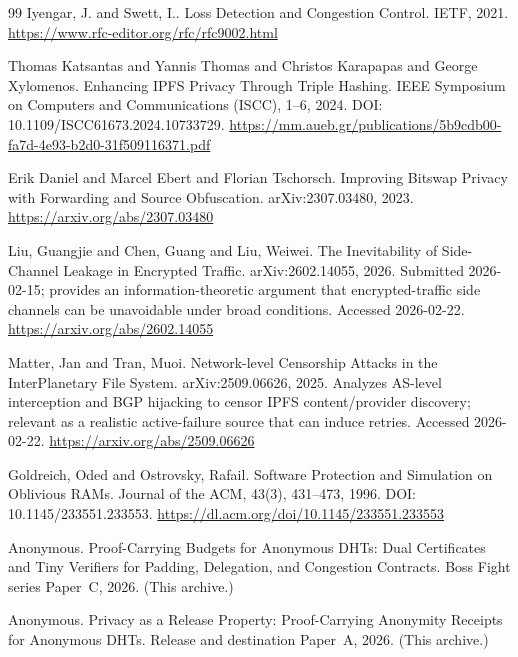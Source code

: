 \documentclass[11pt]{article}
\begin{document}
\begin{thebibliography}{99}
Iyengar, J. and Swett, I..
 Loss Detection and Congestion Control.
\newblock IETF, 2021.
\newblock \url{https://www.rfc-editor.org/rfc/rfc9002.html}

Thomas Katsantas and Yannis Thomas and Christos Karapapas and George Xylomenos.
\newblock Enhancing {IPFS} Privacy Through Triple Hashing.
 {IEEE} Symposium on Computers and Communications (ISCC), 1--6, 2024.
\newblock DOI: 10.1109/ISCC61673.2024.10733729.
\newblock \url{https://mm.aueb.gr/publications/5b9cdb00-fa7d-4e93-b2d0-31f509116371.pdf}

Erik Daniel and Marcel Ebert and Florian Tschorsch.
\newblock Improving {Bitswap} Privacy with Forwarding and Source Obfuscation.
\newblock arXiv:2307.03480, 2023.
\newblock \url{https://arxiv.org/abs/2307.03480}

Liu, Guangjie and Chen, Guang and Liu, Weiwei.
\newblock The Inevitability of Side-Channel Leakage in Encrypted Traffic.
\newblock arXiv:2602.14055, 2026.
\newblock Submitted 2026-02-15; provides an information-theoretic argument that encrypted-traffic side channels can be unavoidable under broad conditions. Accessed 2026-02-22.
\newblock \url{https://arxiv.org/abs/2602.14055}

Matter, Jan and Tran, Muoi.
\newblock Network-level Censorship Attacks in the InterPlanetary File System.
\newblock arXiv:2509.06626, 2025.
\newblock Analyzes AS-level interception and BGP hijacking to censor IPFS content/provider discovery; relevant as a realistic active-failure source that can induce retries. Accessed 2026-02-22.
\newblock \url{https://arxiv.org/abs/2509.06626}

Goldreich, Oded and Ostrovsky, Rafail.
\newblock Software Protection and Simulation on Oblivious {RAM}s.
\newblock Journal of the {ACM}, 43(3), 431--473, 1996.
\newblock DOI: 10.1145/233551.233553.
\newblock \url{https://dl.acm.org/doi/10.1145/233551.233553}

Anonymous.
\newblock Proof-Carrying Budgets for Anonymous DHTs: Dual Certificates and Tiny Verifiers for Padding, Delegation, and Congestion Contracts.
\newblock Boss Fight series Paper~C, 2026. (This archive.)

Anonymous.
\newblock Privacy as a Release Property: Proof-Carrying Anonymity Receipts for Anonymous DHTs.
\newblock Release and destination Paper~A, 2026. (This archive.)


\end{thebibliography}
\end{document}
